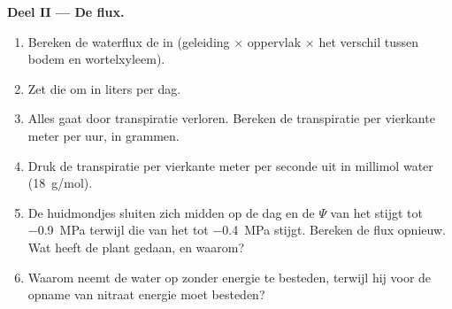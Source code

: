 \begin{problem}
\medskip
\noindent\textbf{Deel II --- De flux.}
\begin{enumerate}[resume]
  \item Bereken de waterflux de  in (geleiding $\times$
        oppervlak $\times$ het verschil tussen bodem en wortelxyleem).
  \item Zet die om in liters per dag.
  \item Alles gaat door transpiratie verloren. Bereken de transpiratie per
        vierkante meter  per uur, in grammen.
  \item Druk de transpiratie per vierkante meter  per seconde uit in
        millimol water (\qty{18}{g/mol}).
  \item De huidmondjes sluiten zich midden op de dag en de $\Psi$ van het
         stijgt tot \qty{-0.9}{MPa} terwijl die van het  tot
        \qty{-0.4}{MPa} stijgt. Bereken de flux opnieuw. Wat heeft de
        plant gedaan, en waarom?
  \item Waarom neemt de  water op zonder energie te besteden,
        terwijl hij voor de opname van nitraat energie moet besteden?
\end{enumerate}


\end{problem}
